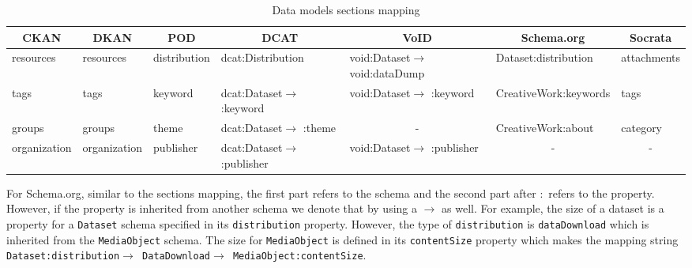 \begin{table}
\begin{adjustwidth}{-.6in}{-.6in}
	\tiny
	\begin{tabular}{|l|l|l|l|l|l|l|}
		\hline
		\multicolumn{1}{|c|}{\textbf{CKAN}} & \multicolumn{1}{c|}{\textbf{DKAN}} & \multicolumn{1}{c|}{\textbf{POD}} & \multicolumn{1}{c|}{\textbf{DCAT}}     & \multicolumn{1}{c|}{\textbf{VoID}}     & \multicolumn{1}{c|}{\textbf{Schema.org}} & \multicolumn{1}{c|}{\textbf{Socrata}} \\ \hline
		resources                           & resources                          & distribution                      & dcat:Distribution                      & void:Dataset$\rightarrow$ void:dataDump & Dataset:distribution                    & attachments                           \\ \hline
		tags                                & tags                               & keyword                           & dcat:Dataset$\rightarrow$ :keyword   & void:Dataset$\rightarrow$ :keyword   & CreativeWork:keywords                     & tags                                  \\ \hline
		groups                              & groups                             & theme                             & dcat:Dataset$\rightarrow$ :theme     &   \multicolumn{1}{c|}{-}                                      & CreativeWork:about                       & category                              \\ \hline
		organization                        & organization                       & publisher                         & dcat:Dataset$\rightarrow$ :publisher &   void:Dataset$\rightarrow$ :publisher                                     & \multicolumn{1}{c|}{-}                   & \multicolumn{1}{c|}{-}                                      \\ \hline
	\end{tabular}
	\caption{Data models sections mapping}
	\label{table:models_section_mappings}
\end{adjustwidth}
\end{table}

For Schema.org, similar to the sections mapping, the first part refers to the schema and the second part after $:$ refers to the property. However, if the property is inherited from another schema we denote that by using a $\rightarrow$ as well. For example, the size of a dataset is a property for a \texttt{Dataset} schema specified in its \texttt{distribution} property. However, the type of \texttt{distribution} is \texttt{dataDownload} which is inherited from the \texttt{MediaObject} schema. The size for \texttt{MediaObject} is defined in its \texttt{contentSize} property which makes the mapping string \texttt{Dataset:distribution$\rightarrow$ DataDownload$\rightarrow$ MediaObject:contentSize}.

